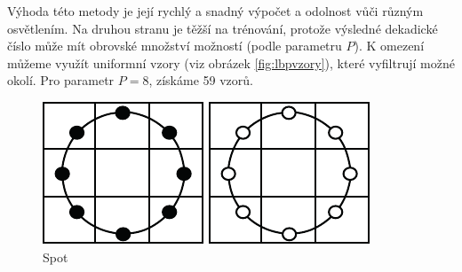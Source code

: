 Výhoda této metody je její rychlý a snadný výpočet a odolnost vůči různým osvětlením. Na druhou stranu je těžší na trénování, protože výsledné dekadické číslo může mít obrovské množství možností (podle parametru $P$). K omezení můžeme využít uniformní vzory (viz obrázek \ref{fig:lbpvzory}), které vyfiltrují možné okolí. Pro parametr $P=8$, získáme 59 vzorů. 

\begin{figure}[H]
\centering
\begin{minipage}[b]{.18\textwidth}
  \centering
  \includegraphics[width=.9\linewidth]{figures/lbp_spot}
  \caption*{Spot}
\end{minipage}
\begin{minipage}[b]{.18\textwidth}
  \centering
  \includegraphics[width=.9\linewidth]{figures/lbp_spot_flat}

\end{minipage}
\end{figure}
